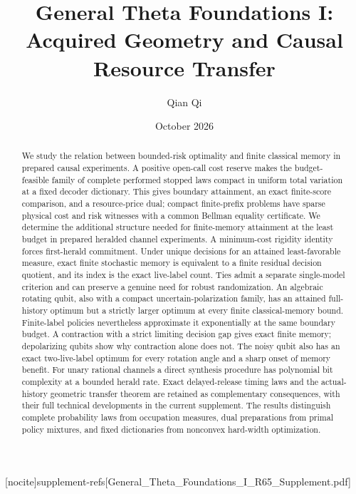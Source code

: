 
[nocite]{supplement-refs}[General_Theta_Foundations_I_R65_Supplement.pdf]
\title[Acquired geometry and causal resource transfer]{General Theta Foundations I:\\Acquired Geometry and Causal Resource Transfer}
\author{Qian Qi}\date{October 2026}

\begin{abstract}
We study the relation between bounded-risk optimality and finite classical memory in prepared causal experiments. A positive open-call cost reserve makes the budget-feasible family of complete performed stopped laws compact in uniform total variation at a fixed decoder dictionary. This gives boundary attainment, an exact finite-score comparison, and a resource-price dual; compact finite-prefix problems have sparse physical cost and risk witnesses with a common Bellman equality certificate. We determine the additional structure needed for finite-memory attainment at the least budget in prepared heralded channel experiments. A minimum-cost rigidity identity forces first-herald commitment. Under unique decisions for an attained least-favorable measure, exact finite stochastic memory is equivalent to a finite residual decision quotient, and its index is the exact live-label count. Ties admit a separate single-model criterion and can preserve a genuine need for robust randomization. An algebraic rotating qubit, also with a compact uncertain-polarization family, has an attained full-history optimum but a strictly larger optimum at every finite classical-memory bound. Finite-label policies nevertheless approximate it exponentially at the same boundary budget. A contraction with a strict limiting decision gap gives exact finite memory; depolarizing qubits show why contraction alone does not. The noisy qubit also has an exact two-live-label optimum for every rotation angle and a sharp onset of memory benefit. For unary rational channels a direct synthesis procedure has polynomial bit complexity at a bounded herald rate. Exact delayed-release timing laws and the actual-history geometric transfer theorem are retained as complementary consequences, with their full technical developments in the current supplement. The results distinguish complete probability laws from occupation measures, dual preparations from primal policy mixtures, and fixed dictionaries from nonconvex hard-width optimization.
\end{abstract}
\maketitle








